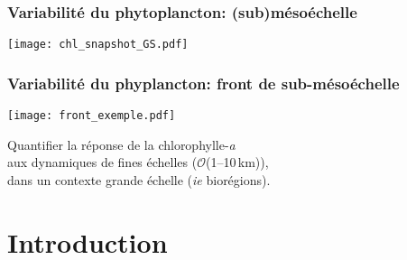 \documentclass[11pt, french, aspectratio=32]{beamer}
\begin{document}

\begin{frame}
  \frametitle{Variabilité du phytoplancton: (sub)mésoéchelle}
    \texttt{[image: chl\_snapshot\_GS.pdf]}
    \\
\end{frame}



\begin{frame}
  \frametitle{Variabilité du phyplancton: front de sub-mésoéchelle}

  \texttt{[image: front\_exemple.pdf]}
  \\

\end{frame}


\begin{frame}


  \vspace{3em}

  {
    \centering
    \begin{onehalfspacing}
      Quantifier la réponse de la chlorophylle-\textit{a}
      \\aux dynamiques de fines échelles (\(\mathcal{O}\)(1--10\,km)),
      \\dans un contexte grande échelle (\textit{ie} biorégions).
      \\
    \end{onehalfspacing}
  }
\end{frame}


\section*{Introduction}


\end{document}
